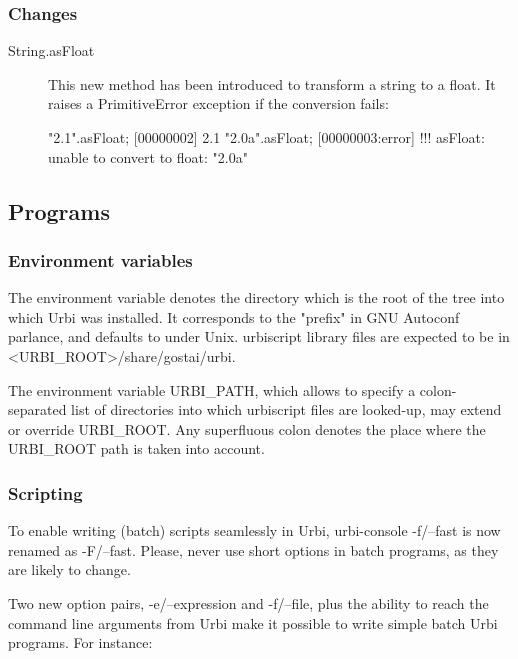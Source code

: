 \subsubsection{Changes}

\begin{description}
\item[String.asFloat] This new method has been introduced to transform
  a string to a float.  It raises a PrimitiveError exception if the
  conversion fails:

\begin{urbiscript}
"2.1".asFloat;
[00000002] 2.1
"2.0a".asFloat;
[00000003:error] !!! asFloat: unable to convert to float: "2.0a"
\end{urbiscript}
\end{description}

\subsection{Programs}

\subsubsection{Environment variables}

The environment variable  denotes the directory which
is the root of the tree into which Urbi was installed.  It corresponds
to the "prefix" in GNU Autoconf parlance, and defaults to
 under Unix.  urbiscript library files are expected
to be in <URBI\_ROOT>/share/gostai/urbi.

The environment variable URBI\_PATH, which allows to specify a
colon-separated list of directories into which urbiscript files are
looked-up, may extend or override URBI\_ROOT.  Any superfluous colon
denotes the place where the URBI\_ROOT path is taken into account.

\subsubsection{Scripting}

To enable writing (batch) scripts seamlessly in Urbi, urbi-console
-f/--fast is now renamed as -F/--fast.  Please, never use short
options in batch programs, as they are likely to change.

Two new option pairs, -e/--expression and -f/--file, plus the ability
to reach the command line arguments from Urbi make it possible to
write simple batch Urbi programs.  For instance:

